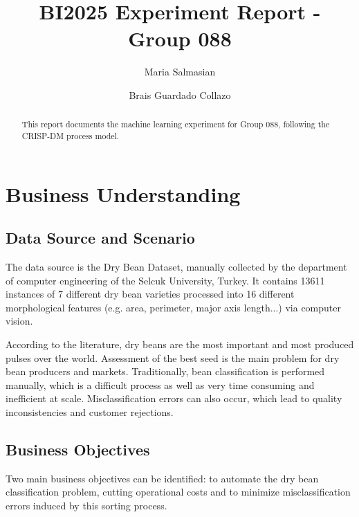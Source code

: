 \documentclass[sigconf]{acmart}
\begin{document}
\title{BI2025 Experiment Report - Group 088}

          \author{Maria Salmasian}
          
          \author{Brais Guardado Collazo}
          

\begin{abstract}
  This report documents the machine learning experiment for Group 088, following the CRISP-DM process model.
\end{abstract}


\maketitle

\section{Business Understanding}

\subsection{Data Source and Scenario}
The data source is the Dry Bean Dataset, manually collected by the department of computer engineering of the Selcuk University, Turkey. It contains 13611 instances of 7 different dry bean varieties processed into 16 different morphological features (e.g. area, perimeter, major axis length...) via computer vision.

According to the literature, dry beans are the most important and most produced pulses over the world. Assessment of the best seed is the main problem for dry bean producers and markets. Traditionally, bean classification is performed manually, which is a difficult process as well as very time consuming and inefficient at scale. Misclassification errors can also occur, which lead to quality inconsistencies and customer rejections.

\subsection{Business Objectives}
Two main business objectives can be identified: to automate the dry bean classification problem, cutting operational costs and to minimize misclassification errors induced by this sorting process.
\end{document}
